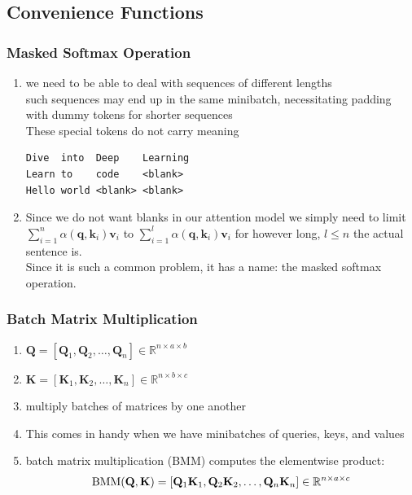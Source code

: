 \subsection{Convenience Functions \cite{dnn-1}}

\subsubsection{Masked Softmax Operation \cite{dnn-1}}

\begin{enumerate}
    \item we need to be able to deal with sequences of different lengths\\
    such sequences may end up in the same minibatch, necessitating padding with dummy tokens for shorter sequences\\
    These special tokens do not carry meaning

\begin{lstlisting}[numbers=none]
Dive  into  Deep    Learning
Learn to    code    <blank>
Hello world <blank> <blank>
\end{lstlisting}
    
    \item Since we do not want blanks in our attention model we simply need to limit $\sum_{i=1}^n \alpha(\mathbf{q}, \mathbf{k}_i) \mathbf{v}_i$ to $\sum_{i=1}^l \alpha(\mathbf{q}, \mathbf{k}_i) \mathbf{v}_i$ for however long, $l \leq n$ the actual sentence is. \\
    Since it is such a common problem, it has a name: the masked softmax operation.

    
\end{enumerate}


\subsubsection{Batch Matrix Multiplication \cite{dnn-1}}



\begin{enumerate}
    \item[] $\mathbf{Q} = [\mathbf{Q}_1, \mathbf{Q}_2, \ldots, \mathbf{Q}_n]  \in \mathbb{R}^{n \times a \times b}$
    
    \item[] $\mathbf{K} = [\mathbf{K}_1, \mathbf{K}_2, \ldots, \mathbf{K}_n]  \in \mathbb{R}^{n \times b \times c}$

    \item multiply batches of matrices by one another

    \item This comes in handy when we have minibatches of queries, keys, and values

    \item batch matrix multiplication (BMM) computes the elementwise product:
    \[
        \hfill
        \textrm{BMM}(\mathbf{Q}, \mathbf{K}) = [\mathbf{Q}_1 \mathbf{K}_1, \mathbf{Q}_2 \mathbf{K}_2, \ldots, \mathbf{Q}_n \mathbf{K}_n] \in \mathbb{R}^{n \times a \times c}
        \hfill
    \]

\end{enumerate}


